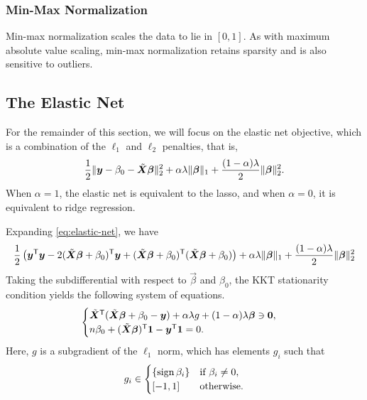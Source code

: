 \subsubsection{Min-Max Normalization}

Min-max normalization scales the data to lie in \([0, 1]\). As with maximum absolute value scaling, min-max normalization retains sparsity and is also sensitive to outliers.

\subsection{The Elastic Net}

For the remainder of this section, we will focus on the elastic net objective, which is a combination of the \(\ell_1\) and \(\ell_2\) penalties, that is,
\begin{equation}
  \label{eq:elastic-net}
  \frac{1}{2} \lVert \vec y - \beta_0 - \tilde{\mat{X}}\vec{\beta} \rVert^2_2  + \alpha\lambda \lVert \vec\beta \rVert_1 + \frac{(1 - \alpha)\lambda}{2}\lVert \vec \beta \rVert_2^2.
\end{equation}
When \(\alpha = 1\), the elastic net is equivalent to the lasso, and when \(\alpha = 0\), it is equivalent to ridge regression.

Expanding \eqref{eq:elastic-net}, we have
\[
  \begin{aligned}
    \frac{1}{2}\left( \vec y^\T \vec y - 2(\tilde{\mat{X}}\vec{\beta} + \beta_0)^\T\vec{y} + (\tilde{\mat{X}}\vec{\beta} + \beta_0)^\T(\tilde{\mat{X}}\vec{\beta} + \beta_0)\right) + \alpha\lambda \lVert \vec\beta \rVert_1 + \frac{(1 - \alpha)\lambda}{2}\lVert \vec \beta \rVert_2^2 \\
  \end{aligned}
\]
Taking the subdifferential with respect to \(\vec{\beta}\) and \(\beta_0\), the KKT stationarity condition yields the following system of equations.
\[
  \begin{cases}
    \tilde{\mat{X}}^\T(\tilde{\mat{X}}\vec{\beta} + \beta_0 - \vec{y}) + \alpha\lambda g + (1 - \alpha)\lambda \vec\beta \ni \vec{0}, \\
    n \beta_0 + (\tilde{\mat{X}}\vec{\beta})^\T \vec{1} - \vec{y}^\T \vec{1} = 0.
  \end{cases}
\]
Here, \(g\) is a subgradient of the \(\ell_1\) norm, which has elements \(g_i\) such that
\[
  g_i \in
  \begin{cases}
    \{\operatorname{sign}{\beta_i}\} & \text{if } \beta_i \neq 0, \\
    [-1, 1]            & \text{otherwise}.
  \end{cases}
\]


